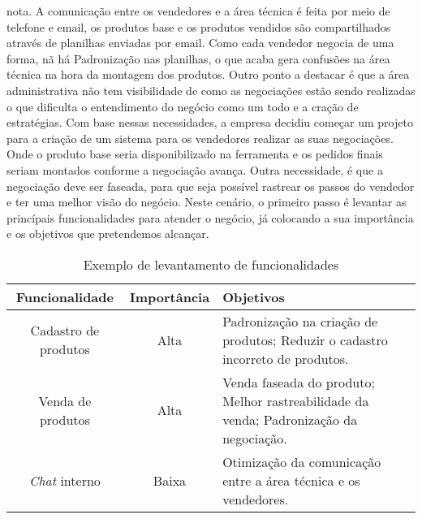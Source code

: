       nota. A comunicação entre os vendedores e a área técnica é feita por meio de
      telefone e email, os produtos base e os produtos vendidos são compartilhados
      através de planilhas enviadas por email. Como cada vendedor negocia de uma
      forma, nã há Padronização nas planilhas, o que acaba gera confusões na área
      técnica na hora da montagem dos produtos. Outro ponto a destacar é que a área
      administrativa não tem visibilidade de como as negociações estão sendo realizadas
      o que dificulta o entendimento do negócio como um todo e a cração de
      estratégias. \newline
      Com base nessas necessidades, a empresa decidiu começar um projeto para a
      criação de um sistema para os vendedores realizar as suas negociações.
      Onde o produto base seria disponibilizado na ferramenta e os pedidos finais
      seriam montados conforme a negociação avança. Outra necessidade, é que a
      negociação deve ser faseada, para que seja possível rastrear os passos do
      vendedor e ter uma melhor visão do negócio. \newline
      Neste cenário, o primeiro passo é levantar as princípais funcionalidades para
      atender o negócio, já colocando a sua importância e os objetivos que pretendemos
      alcançar.

      \begin{table}[h!]
        \centering
        \begin{tabular}{|c|c|p{8cm}|}
          \hline
          \textbf{Funcionalidade} &
          \textbf{Importância}  &
          \textbf{Objetivos} \\ \hline
          Cadastro de produtos &
          Alta &
          Padronização na criação de produtos; \newline
          Reduzir o cadastro incorreto de produtos.
          \\ \hline
          Venda de produtos &
          Alta &
          Venda faseada do produto; \newline
          Melhor rastreabilidade da venda; \newline
          Padronização da negociação.
          \\ \hline
          \textit{Chat} interno &
          Baixa &
          Otimização da comunicação entre a área técnica e os vendedores.
          \\ \hline
        \end{tabular}
        \caption{Exemplo de levantamento de funcionalidades}
        \label{Tabela:2}
      \end{table}

